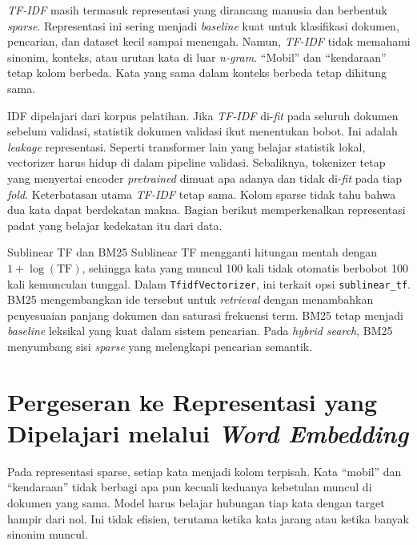 \emph{TF-IDF} masih termasuk representasi yang dirancang manusia dan berbentuk \emph{sparse}. Representasi ini sering menjadi \emph{baseline} kuat untuk klasifikasi dokumen, pencarian, dan dataset kecil sampai menengah. Namun, \emph{TF-IDF} tidak memahami sinonim, konteks, atau urutan kata di luar \emph{n-gram}. ``Mobil'' dan ``kendaraan'' tetap kolom berbeda. Kata yang sama dalam konteks berbeda tetap dihitung sama.

IDF dipelajari dari korpus pelatihan. Jika \emph{TF-IDF} di-\emph{fit} pada seluruh dokumen sebelum validasi, statistik dokumen validasi ikut menentukan bobot. Ini adalah \emph{leakage} representasi. Seperti transformer lain yang belajar statistik lokal, vectorizer harus hidup di dalam pipeline validasi. Sebaliknya, tokenizer tetap yang menyertai encoder \emph{pretrained} dimuat apa adanya dan tidak di-\emph{fit} pada tiap \emph{fold}. Keterbatasan utama \emph{TF-IDF} tetap sama. Kolom sparse tidak tahu bahwa dua kata dapat berdekatan makna. Bagian berikut memperkenalkan representasi padat yang belajar kedekatan itu dari data.

\begin{pendalaman}{Sublinear TF dan BM25}
Sublinear TF mengganti hitungan mentah dengan \(1 + \log(\text{TF})\), sehingga kata yang muncul 100 kali tidak otomatis berbobot 100 kali kemunculan tunggal. Dalam \passthrough{\lstinline!TfidfVectorizer!}, ini terkait opsi \passthrough{\lstinline!sublinear_tf!}. BM25 mengembangkan ide tersebut untuk \emph{retrieval} dengan menambahkan penyesuaian panjang dokumen dan saturasi frekuensi term. BM25 tetap menjadi \emph{baseline} leksikal yang kuat dalam sistem pencarian. Pada \emph{hybrid search}, BM25 menyumbang sisi \emph{sparse} yang melengkapi pencarian semantik.
\end{pendalaman}

\section{\texorpdfstring{Pergeseran ke Representasi yang Dipelajari melalui \emph{Word Embedding}}{Pergeseran ke Representasi yang Dipelajari melalui Word Embedding}}\label{pergeseran-ke-representasi-yang-dipelajari-melalui-word-embedding}

Pada representasi sparse, setiap kata menjadi kolom terpisah. Kata ``mobil'' dan ``kendaraan'' tidak berbagi apa pun kecuali keduanya kebetulan muncul di dokumen yang sama. Model harus belajar hubungan tiap kata dengan target hampir dari nol. Ini tidak efisien, terutama ketika kata jarang atau ketika banyak sinonim muncul.

